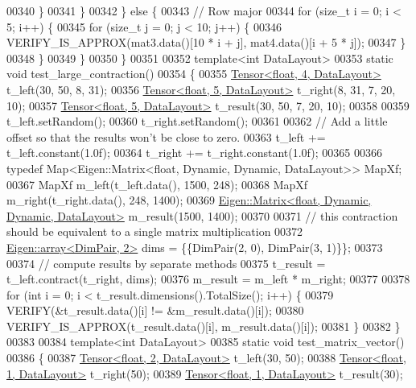 \begin{DoxyCode}
00340       \}
00341     \}
00342   \} \textcolor{keywordflow}{else} \{
00343     \textcolor{comment}{// Row major}
00344     \textcolor{keywordflow}{for} (\textcolor{keywordtype}{size\_t} i = 0; i < 5; i++) \{
00345       \textcolor{keywordflow}{for} (\textcolor{keywordtype}{size\_t} j = 0; j < 10; j++) \{
00346         VERIFY\_IS\_APPROX(mat3.data()[10 * i + j], mat4.data()[i + 5 * j]);
00347       \}
00348     \}
00349   \}
00350 \}
00351 
00352 \textcolor{keyword}{template}<\textcolor{keywordtype}{int} DataLayout>
00353 \textcolor{keyword}{static} \textcolor{keywordtype}{void} test\_large\_contraction()
00354 \{
00355   \hyperlink{class_eigen_1_1_tensor}{Tensor<float, 4, DataLayout>} t\_left(30, 50, 8, 31);
00356   \hyperlink{class_eigen_1_1_tensor}{Tensor<float, 5, DataLayout>} t\_right(8, 31, 7, 20, 10);
00357   \hyperlink{class_eigen_1_1_tensor}{Tensor<float, 5, DataLayout>} t\_result(30, 50, 7, 20, 10);
00358 
00359   t\_left.setRandom();
00360   t\_right.setRandom();
00361 
00362   \textcolor{comment}{// Add a little offset so that the results won't be close to zero.}
00363   t\_left += t\_left.constant(1.0f);
00364   t\_right += t\_right.constant(1.0f);
00365 
00366   \textcolor{keyword}{typedef} Map<Eigen::Matrix<float, Dynamic, Dynamic, DataLayout>> MapXf;
00367   MapXf m\_left(t\_left.data(), 1500, 248);
00368   MapXf m\_right(t\_right.data(), 248, 1400);
00369   \hyperlink{group___core___module_class_eigen_1_1_matrix}{Eigen::Matrix<float, Dynamic, Dynamic, DataLayout>} 
      m\_result(1500, 1400);
00370 
00371   \textcolor{comment}{// this contraction should be equivalent to a single matrix multiplication}
00372   \hyperlink{class_eigen_1_1array}{Eigen::array<DimPair, 2>} dims = \{\{DimPair(2, 0), DimPair(3, 1)\}\};
00373 
00374   \textcolor{comment}{// compute results by separate methods}
00375   t\_result = t\_left.contract(t\_right, dims);
00376   m\_result = m\_left * m\_right;
00377 
00378   \textcolor{keywordflow}{for} (\textcolor{keywordtype}{int} i = 0; i < t\_result.dimensions().TotalSize(); i++) \{
00379     VERIFY(&t\_result.data()[i] != &m\_result.data()[i]);
00380     VERIFY\_IS\_APPROX(t\_result.data()[i], m\_result.data()[i]);
00381   \}
00382 \}
00383 
00384 \textcolor{keyword}{template}<\textcolor{keywordtype}{int} DataLayout>
00385 \textcolor{keyword}{static} \textcolor{keywordtype}{void} test\_matrix\_vector()
00386 \{
00387   \hyperlink{class_eigen_1_1_tensor}{Tensor<float, 2, DataLayout>} t\_left(30, 50);
00388   \hyperlink{class_eigen_1_1_tensor}{Tensor<float, 1, DataLayout>} t\_right(50);
00389   \hyperlink{class_eigen_1_1_tensor}{Tensor<float, 1, DataLayout>} t\_result(30);

\end{DoxyCode}
